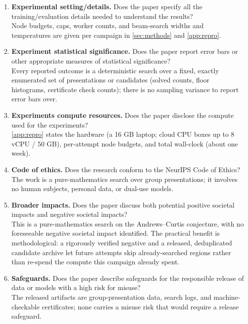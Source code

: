 \begin{enumerate}
  \item \textbf{Experimental setting/details.} Does the paper specify all the
    training/evaluation details needed to understand the results?\\
    \answerYes{} Node budgets, caps, worker counts, and beam-search widths and temperatures
    are given per campaign in \ref{sec:methods} and \ref{app:repro}.

  \item \textbf{Experiment statistical significance.} Does the paper report error bars or
    other appropriate measures of statistical significance?\\
    \answerNA{} Every reported outcome is a deterministic search over a fixed, exactly
    enumerated set of presentations or candidates (solved counts, floor histograms,
    certificate check counts); there is no sampling variance to report error bars over.

  \item \textbf{Experiments compute resources.} Does the paper disclose the compute used for
    the experiments?\\
    \answerYes{} \ref{app:repro} states the hardware (a 16 GB laptop; cloud CPU boxes up to
    8 vCPU / 50 GB), per-attempt node budgets, and total wall-clock (about one week).

  \item \textbf{Code of ethics.} Does the research conform to the NeurIPS Code of Ethics?\\
    \answerYes{} The work is a pure-mathematics search over group presentations; it involves
    no human subjects, personal data, or dual-use models.

  \item \textbf{Broader impacts.} Does the paper discuss both potential positive societal
    impacts and negative societal impacts?\\
    \answerYes{} This is a pure-mathematics search on the Andrews--Curtis conjecture, with no
    foreseeable negative societal impact identified. The practical benefit is
    methodological: a rigorously verified negative and a released, deduplicated candidate
    archive let future attempts skip already-searched regions rather than re-spend the
    compute this campaign already spent.

  \item \textbf{Safeguards.} Does the paper describe safeguards for the responsible release
    of data or models with a high risk for misuse?\\
    \answerNA{} The released artifacts are group-presentation data, search logs, and
    machine-checkable certificates; none carries a misuse risk that would require a release
    safeguard.


\end{enumerate}
